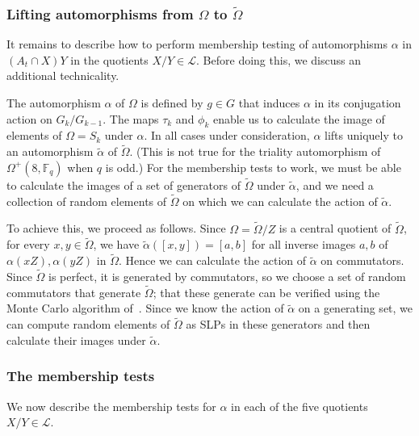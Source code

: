 \documentclass[12pt,twoside,reqno,psamsfonts]{amsproc}
\numberwithin{equation}{section}
\numberwithin{figure}{section}
\newcounter{algorithm}
\theoremstyle{plain}
\theoremstyle{definition}
\theoremstyle{remark}
\newcommand{\field}[1]{\mathbb{#1}}
\newcommand{\F}{\field{F}}
\begin{document}
\subsubsection{Lifting automorphisms from $\Omega$ to $\widetilde{\Omega}$}
It remains to describe how to perform membership testing of automorphisms
$\alpha$ in $(A_t \cap X)Y$ in the quotients $X/Y \in \mathcal{L}$.
Before doing this, we discuss an additional technicality.

The automorphism  $\alpha$ of $\Omega$ is defined by %
$g \in G$ that induces $\alpha$ in its conjugation action on $G_k/G_{k-1}$.
The maps $\tau_k$ and $\phi_k$ enable us to calculate the image of
elements of $\Omega = S_k$ under $\alpha$. In all cases under
consideration, $\alpha$ lifts uniquely to an automorphism $\tilde{\alpha}$
of $\widetilde{\Omega}$. (This is not true for the triality
automorphism of $\Omega^+(8,\F_q)$ when $q$ is odd.)
For the membership tests to work, we must be able to calculate the images
of a set of generators of $\widetilde{\Omega}$ under $\tilde{\alpha}$, and
we need a collection of random elements of $\widetilde{\Omega}$ on which
we can calculate the action of $\tilde{\alpha}$.

To achieve this, we proceed as follows. Since $\Omega = \widetilde{\Omega}/Z$
is a central quotient of
$\widetilde{\Omega}$, for every $x,y \in \widetilde{\Omega}$, 
we have $\tilde{\alpha}([x,y]) = [a,b]$ for all
inverse images $a,b$ of $\alpha(xZ),\alpha(yZ)$ in $\widetilde{\Omega}$.
Hence we can calculate the action of $\tilde{\alpha}$ on commutators.
Since $\widetilde{\Omega}$ is perfect, it is generated by
commutators, so we choose a set of random commutators that
generate $\widetilde{\Omega}$; that these generate can be verified using
the Monte Carlo algorithm of~\cite{MR1625479}.  
Since we know the action of $\tilde{\alpha}$ on a generating set, 
we can compute
random elements of $\widetilde{\Omega}$ as SLPs in these generators and
then calculate their images under $\tilde{\alpha}$.

\subsubsection{The membership tests}
We now describe the membership tests for $\alpha$ in each
of the five quotients $X/Y \in \mathcal{L}$.
\end{document}
